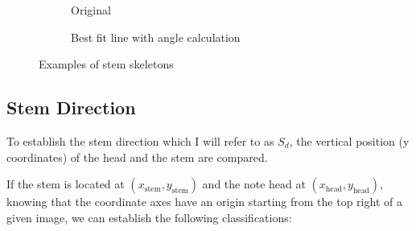 \begin{figure}[h!]
    \centering

    \begin{subfigure}[b]{.45\linewidth}
        \centering
        \caption{Original}
    \end{subfigure}
    \begin{subfigure}[b]{.45\linewidth}
        \centering
        \caption{Best fit line with angle calculation}
    \end{subfigure}

    \caption{Examples of stem skeletons}
    \label{fig:stem-skeletons}
\end{figure}




\subsection{Stem Direction}

To establish the stem direction which I will refer to as $S_d$, the vertical position (y coordinates) of the head and the stem are compared.

If the stem is located at $(x_{\text{stem}}, y_{\text{stem}})$ and the note head at $(x_{\text{head}}, y_{\text{head}})$, knowing that the coordinate axes have an origin starting from the top right of a given image, we can establish the following classifications:

